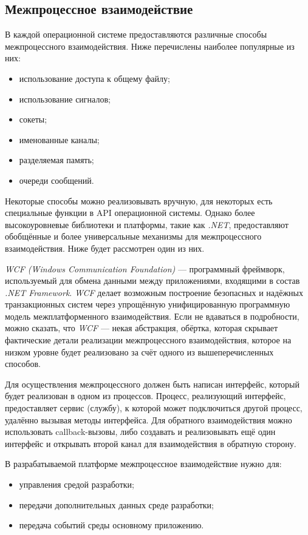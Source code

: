 \subsection{Межпроцессное взаимодействие}
\label{sec:ipc}

В каждой операционной системе предоставляются различные способы межпроцессного взаимодействия. Ниже перечислены наиболее популярные из них:
\begin{itemize}
   \item использование доступа к общему файлу;
   \item использование сигналов;
   \item сокеты;
   \item именованные каналы;
   \item разделяемая память;
   \item очереди сообщений.
\end{itemize}

Некоторые способы можно реализовывать вручную, для некоторых есть специальные функции в API операционной системы. Однако более высокоуровневые библиотеки и платформы, такие как {\it .NET}, предоставляют обобщённые и более универсальные механизмы для межпроцессного взаимодействия. Ниже будет рассмотрен один из них.

{\it WCF (Windows Communication Foundation)} --- программный фреймворк, используемый для обмена данными между приложениями, входящими в состав {\it .NET Framework}. {\it WCF} делает возможным построение безопасных и надёжных транзакционных систем через упрощённую унифицированную программную модель межплатформенного взаимодействия. Если не вдаваться в подробности, можно сказать, что {\it WCF} --- некая абстракция, обёртка, которая скрывает фактические детали реализации межпроцессного взаимодействия, которое на низком уровне будет реализовано за счёт одного из вышеперечисленных способов. 

Для осуществления межпроцессного должен быть написан интерфейс, который будет реализован в одном из процессов. Процесс, реализующий интерфейс, предоставляет сервис (службу), к которой может подключиться другой процесс, удалённо вызывая методы интерфейса. Для обратного взаимодействия можно использовать callback-вызовы, либо создавать и реализовывать ещё один интерфейс и открывать второй канал для взаимодействия в обратную сторону. 

В разрабатываемой платформе межпроцессное взаимодействие нужно для:
\begin{itemize}
 \item управления средой разработки;
 \item передачи дополнительных данных среде разработки;
 \item передача событий среды основному приложению.
\end{itemize}


\pagebreak
